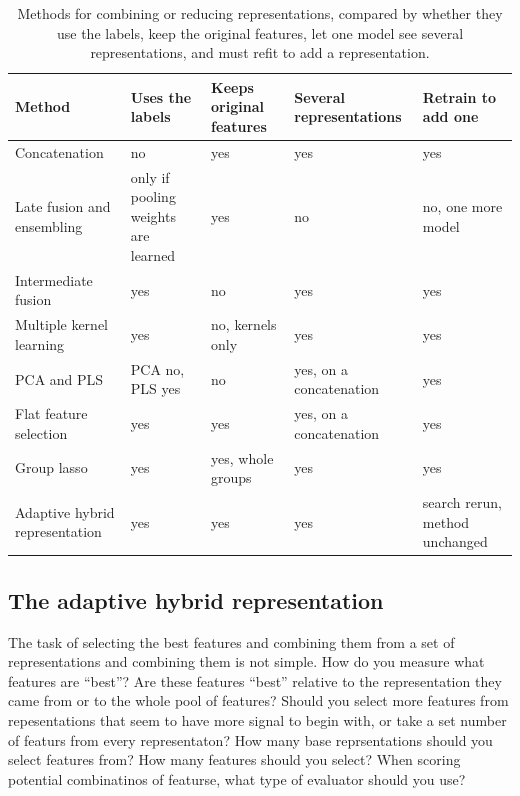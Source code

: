 \begin{table}[htbp]
\centering
\small
\setlength{\tabcolsep}{3pt}
\begin{adjustbox}{max width=\textwidth,max totalheight=0.78\textheight}
\begin{tabular}{P{4.2cm}P{2.3cm}P{2.1cm}P{2.3cm}P{2.6cm}}
\toprule
Method & Uses the labels & Keeps original features & Several representations & Retrain to add one \\
\midrule
Concatenation \citep{Stahlschmidt2022} & no & yes & yes & yes \\
Late fusion and ensembling \citep{Steyaert2023, Valsecchi2020, Wang2021} & only if pooling weights are learned & yes & no & no, one more model \\
Intermediate fusion \citep{Beaude2025} & yes & no & yes & yes \\
Multiple kernel learning \citep{Gonen2011, Cichonska2018} & yes & no, kernels only & yes & yes \\
PCA and PLS \citep{Jolliffe2016, Wold2001} & PCA no, PLS yes & no & yes, on a concatenation & yes \\
Flat feature selection \citep{Guyon2003} & yes & yes & yes, on a concatenation & yes \\
Group lasso \citep{Yuan2006} & yes & yes, whole groups & yes & yes \\
Adaptive hybrid representation & yes & yes & yes & search rerun, method unchanged \\
\bottomrule
\end{tabular}
\end{adjustbox}
\caption[Methods for combining or reducing representations.]{Methods for combining or reducing representations, compared by whether they use the labels, keep the original features, let one model see several representations, and must refit to add a representation.}
\label{tab:hybrid_alternatives}
\end{table}

\subsection{The adaptive hybrid representation}

The task of selecting the best features and combining them from a set of representations and combining them is not simple. How do you measure what features are ``best''? Are these features ``best'' relative to the representation they came from or to the whole pool of features? Should you select more features from repesentations that seem to have more signal to begin with, or take a set number of featurs from every representaton? How many base reprsentations should you select features from? How many features should you select? When scoring potential combinatinos of featurse, what type of evaluator should you use? 


